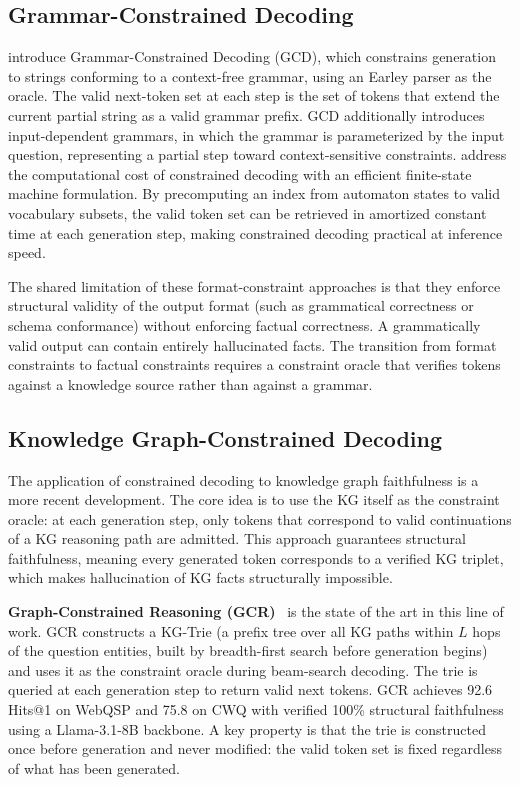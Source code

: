 \subsection{Grammar-Constrained Decoding}

\citet{geng2023gcd} introduce Grammar-Constrained Decoding (GCD), which constrains generation to strings conforming to a context-free grammar, using an Earley parser as the oracle. The valid next-token set at each step is the set of tokens that extend the current partial string as a valid grammar prefix. GCD additionally introduces input-dependent grammars, in which the grammar is parameterized by the input question, representing a partial step toward context-sensitive constraints. \citet{willard2023outlines} address the computational cost of constrained decoding with an efficient finite-state machine formulation. By precomputing an index from automaton states to valid vocabulary subsets, the valid token set can be retrieved in amortized constant time at each generation step, making constrained decoding practical at inference speed.

The shared limitation of these format-constraint approaches is that they enforce structural validity of the output format (such as grammatical correctness or schema conformance) without enforcing factual correctness. A grammatically valid output can contain entirely hallucinated facts. The transition from format constraints to factual constraints requires a constraint oracle that verifies tokens against a knowledge source rather than against a grammar.

\subsection{Knowledge Graph-Constrained Decoding}

The application of constrained decoding to knowledge graph faithfulness is a more recent development. The core idea is to use the KG itself as the constraint oracle: at each generation step, only tokens that correspond to valid continuations of a KG reasoning path are admitted. This approach guarantees structural faithfulness, meaning every generated token corresponds to a verified KG triplet, which makes hallucination of KG facts structurally impossible.

\textbf{Graph-Constrained Reasoning (GCR)}~\citep{luo2024gcr} is the state of the art in this line of work. GCR constructs a KG-Trie (a prefix tree over all KG paths within $L$ hops of the question entities, built by breadth-first search before generation begins) and uses it as the constraint oracle during beam-search decoding. The trie is queried at each generation step to return valid next tokens. GCR achieves 92.6 Hits@1 on WebQSP and 75.8 on CWQ with verified 100\% structural faithfulness using a Llama-3.1-8B backbone. A key property is that the trie is constructed once before generation and never modified: the valid token set is fixed regardless of what has been generated.

